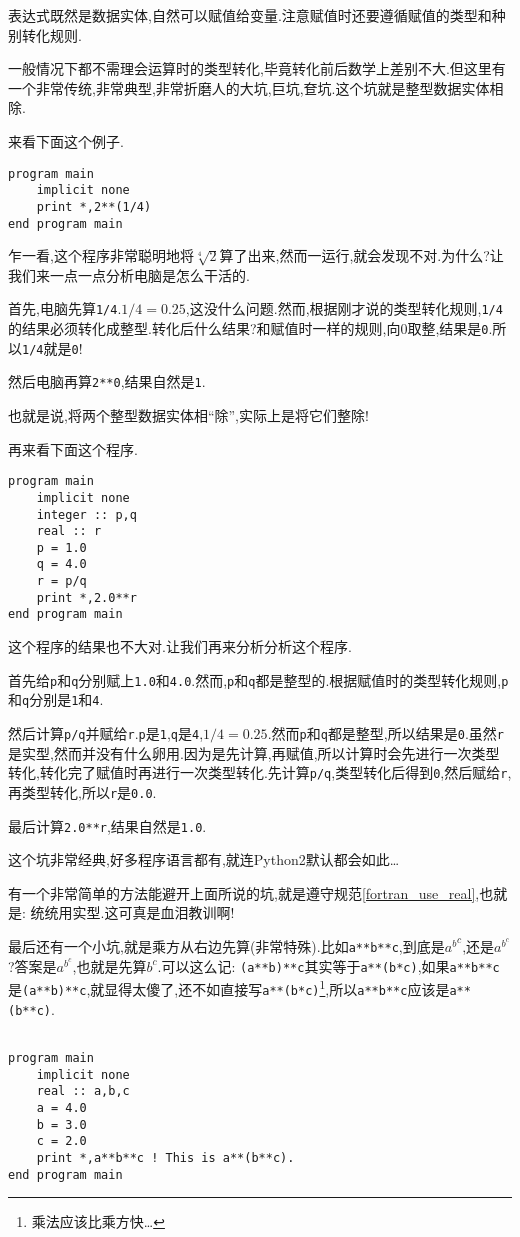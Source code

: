 表达式既然是数据实体,自然可以赋值给变量.注意赋值时还要遵循赋值的类型和种别转化规则.

一般情况下都不需理会运算时的类型转化,毕竟转化前后数学上差别不大.但这里有一个非常传统,非常典型,非常折磨人的大坑,巨坑,奆坑.这个坑就是整型数据实体相除.

来看下面这个例子.
\begin{lstlisting}
program main
    implicit none
    print *,2**(1/4)
end program main
\end{lstlisting}

乍一看,这个程序非常聪明地将$\sqrt[4]{2}$算了出来,然而一运行,就会发现不对.为什么?让我们来一点一点分析电脑是怎么干活的.

首先,电脑先算\texttt{1/4}.$1/4=0.25$,这没什么问题.然而,根据刚才说的类型转化规则,\texttt{1/4}的结果必须转化成整型.转化后什么结果?和赋值时一样的规则,向0取整,结果是\texttt{0}.所以\texttt{1/4}就是\texttt{0}!

然后电脑再算\texttt{2**0},结果自然是\texttt{1}.

也就是说,将两个整型数据实体相``除'',实际上是将它们整除!

再来看下面这个程序.

\begin{lstlisting}
program main
    implicit none
    integer :: p,q
    real :: r
    p = 1.0
    q = 4.0
    r = p/q
    print *,2.0**r
end program main
\end{lstlisting}
这个程序的结果也不大对.让我们再来分析分析这个程序.

首先给\texttt{p}和\texttt{q}分别赋上\texttt{1.0}和\texttt{4.0}.然而,\texttt{p}和\texttt{q}都是整型的.根据赋值时的类型转化规则,\texttt{p}和\texttt{q}分别是\texttt{1}和\texttt{4}.

然后计算\texttt{p/q}并赋给\texttt{r}.\texttt{p}是\texttt{1},\texttt{q}是\texttt{4},$1/4=0.25$.然而\texttt{p}和\texttt{q}都是整型,所以结果是\texttt{0}.虽然\texttt{r}是实型,然而并没有什么卵用.因为是先计算,再赋值,所以计算时会先进行一次类型转化,转化完了赋值时再进行一次类型转化.先计算\texttt{p/q},类型转化后得到\texttt{0},然后赋给\texttt{r},再类型转化,所以\texttt{r}是\texttt{0.0}.

最后计算\texttt{2.0**r},结果自然是\texttt{1.0}.

这个坑非常经典,好多程序语言都有,就连Python2默认都会如此\dots

有一个非常简单的方法能避开上面所说的坑,就是遵守规范\ref{fortran_use_real},也就是: 统统用实型.这可真是血泪教训啊!

最后还有一个小坑,就是乘方从右边先算(非常特殊).比如\texttt{a**b**c},到底是${a^b}^c$,还是$a^{b^c}$?答案是$a^{b^c}$,也就是先算$b^c$.可以这么记: \texttt{(a**b)**c}其实等于\texttt{a**(b*c)},如果\texttt{a**b**c}是\texttt{(a**b)**c},就显得太傻了,还不如直接写\texttt{a**(b*c)}\footnote{
    乘法应该比乘方快\dots
},所以\texttt{a**b**c}应该是\texttt{a**(b**c)}.
\begin{lstlisting}

program main
    implicit none
    real :: a,b,c
    a = 4.0
    b = 3.0
    c = 2.0
    print *,a**b**c ! This is a**(b**c).
end program main
\end{lstlisting}

